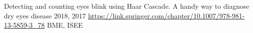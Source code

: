 Detecting and counting eyes blink using Haar Cascade. A handy way to diagnose dry eyes disease \hfill  2018, 2017 
\url{https://link.springer.com/chapter/10.1007/978-981-13-5859-3_78} 
\hfill BME, ISEE
 